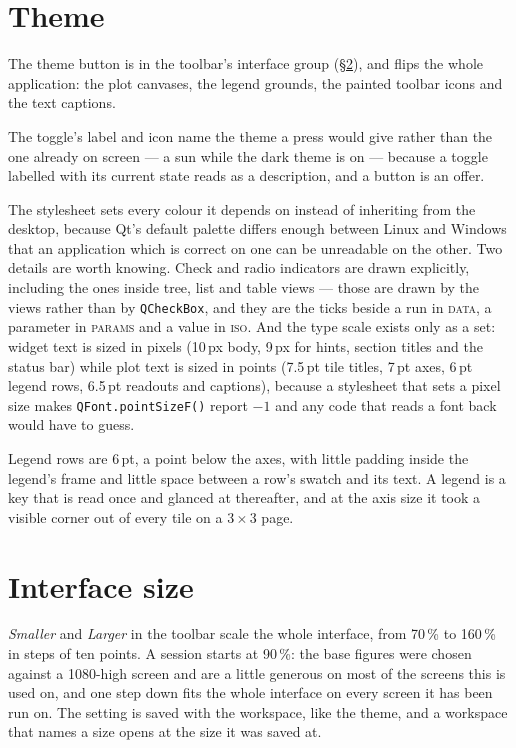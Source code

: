 \documentclass[11pt,a4paper,oneside]{report}
\newcommand{\code}[1]{\texttt{#1}}
\newcommand{\tab}[1]{\textsc{#1}}
\begin{document}
\section{Theme}
\label{sec:theme}

The theme button is in the toolbar's interface group (\S\ref{sec:uiscale}),
and flips the whole application: the plot canvases, the legend grounds, the
painted toolbar icons and the text captions.

The toggle's label and icon name the theme a press would give rather than the
one already on screen --- a sun while the dark theme is on --- because a toggle
labelled with its current state reads as a description, and a button is an
offer.

The stylesheet sets every colour it depends on instead of inheriting from the
desktop, because Qt's default palette differs enough between Linux and Windows
that an application which is correct on one can be unreadable on the other. Two
details are worth knowing. Check and radio indicators are drawn explicitly,
including the ones inside tree, list and table views --- those are drawn by the
views rather than by \code{QCheckBox}, and they are the ticks beside a run in
\tab{data}, a parameter in \tab{params} and a value in \tab{iso}. And the type
scale exists only as a set: widget text is sized in pixels (10\,px body, 9\,px
for hints, section titles and the status bar) while plot text is sized in points
(7.5\,pt tile titles, 7\,pt axes, 6\,pt legend rows, 6.5\,pt readouts and
captions), because a stylesheet that sets a pixel size makes
\code{QFont.pointSizeF()} report $-1$ and any code that reads a font back would
have to guess.

Legend rows are 6\,pt, a point below the axes, with little padding inside the
legend's frame and little space between a row's swatch and its text. A legend is
a key that is read once and glanced at thereafter, and at the axis size it took
a visible corner out of every tile on a $3 \times 3$ page.

\section{Interface size}
\label{sec:uiscale}

\emph{Smaller} and \emph{Larger} in the toolbar scale the whole interface, from
70\,\% to 160\,\% in steps of ten points. A session starts at 90\,\%: the base
figures were chosen against a 1080-high screen and are a little generous on most
of the screens this is used on, and one step down fits the whole interface on
every screen it has been run on. The setting is saved with the workspace, like
the theme, and a workspace that names a size opens at the size it was saved at.
\end{document}
